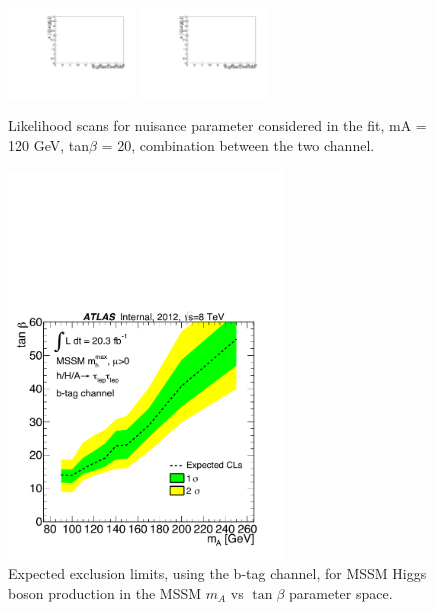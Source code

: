 \begin{figure}[htp]
\begin{center}
            \includegraphics[page=51,width=0.3\textwidth]{figure/np_check/comb_LLHscan.pdf}
            \includegraphics[page=52,width=0.3\textwidth]{figure/np_check/comb_LLHscan.pdf}\\

    \end{center}
    \caption{ Likelihood scans for nuisance parameter considered in the fit,  mA = 120 GeV, tan$\beta$ = 20, combination between the two channel.} 
    \label{fig:llh_3}
\end{figure}

\begin{figure}[]
  \centering
  \includegraphics[width=0.65\textwidth]{figure/limits/Limits_mAtanBeta_BTag.pdf}
  \caption{Expected %
  exclusion limits, using the b-tag channel, for MSSM Higgs boson production 
in the MSSM $m_A$ vs $\tan\beta$ parameter space.}
\label{fig:limit_extract_combined2}
\end{figure}


